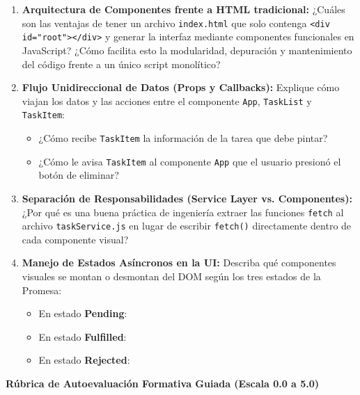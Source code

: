 \documentclass[10pt,letterpaper]{article}
\newcommand{\sectionBadge}[1]{%
  \refstepcounter{section}%
  \vspace{0.24cm}%
  \noindent%
  \colorbox{icesiBlue}{\color{white}\rule[-0.08cm]{0pt}{0.42cm}\hspace{0.16cm}\textbf{\normalsize \thesection}\hspace{0.16cm}}%
  \hspace{0.18cm}%
  {\fontsize{9.5}{12}\selectfont\textbf{\color{icesiDark}#1}}\\[-0.10cm]%
  \noindent{\color{icesiDark}\rule{\textwidth}{0.8pt}}\vspace{0.10cm}%
}
\begin{document}
\begin{enumerate}[leftmargin=*,itemsep=4pt,topsep=2pt]
  \item \textbf{Arquitectura de Componentes frente a HTML tradicional:} ¿Cuáles son las ventajas de tener un archivo \texttt{index.html} que solo contenga \texttt{<div id="root"></div>} y generar la interfaz mediante componentes funcionales en JavaScript? ¿Cómo facilita esto la modularidad, depuración y mantenimiento del código frente a un único script monolítico?
  \item \textbf{Flujo Unidireccional de Datos (Props y Callbacks):} Explique cómo viajan los datos y las acciones entre el componente \texttt{App}, \texttt{TaskList} y \texttt{TaskItem}:
    \begin{itemize}
      \item ¿Cómo recibe \texttt{TaskItem} la información de la tarea que debe pintar?
      \item ¿Cómo le avisa \texttt{TaskItem} al componente \texttt{App} que el usuario presionó el botón de eliminar?
    \end{itemize}
  \item \textbf{Separación de Responsabilidades (Service Layer vs. Componentes):} ¿Por qué es una buena práctica de ingeniería extraer las funciones \texttt{fetch} al archivo \texttt{taskService.js} en lugar de escribir \texttt{fetch()} directamente dentro de cada componente visual?
  \item \textbf{Manejo de Estados Asíncronos en la UI:} Describa qué componentes visuales se montan o desmontan del DOM según los tres estados de la Promesa:
    \begin{itemize}
      \item En estado \textbf{Pending}:
      \item En estado \textbf{Fulfilled}:
      \item En estado \textbf{Rejected}:
    \end{itemize}
\end{enumerate}

\sectionBadge{Rúbrica de Autoevaluación Formativa Guiada (Escala 0.0 a 5.0)}
\end{document}
